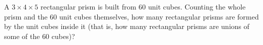 A $3\times4\times5$ rectangular prism is built from $60$ unit cubes. Counting the whole prism and the $60$ unit cubes themselves, how many rectangular prisms are formed by the unit cubes inside it (that is, how many rectangular prisms are unions of some of the $60$ cubes)?
